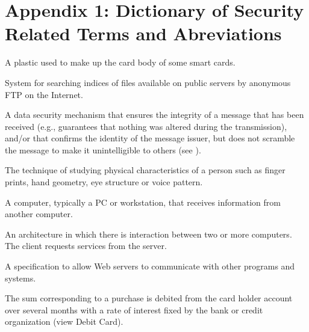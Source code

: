 \chapter{Appendix 1: Dictionary of Security Related Terms and Abreviations}

\begin{htmllist}
\item[Acrylonitrile Butadiene Styrene (ABS)]

A plastic used to make up the card body of some smart cards.


\item[Archie]

System for searching indices of files available on public servers by
anonymous FTP on the Internet.


\item[Authentication]
\label{authen}

A data security mechanism that ensures the integrity of a message that
has been received (e.g., guarantees that nothing was altered during the
transmission), and/or that confirms the identity of the message issuer,
but does not scramble the message to make it unintelligible to others
(see ).


\item[Biometrics]

The technique of studying physical characteristics of a person such as
finger prints, hand geometry, eye structure or voice pattern.


\item[Client]

A computer, typically a PC or workstation, that receives information
from another computer.


\item[Client-server]

An architecture in which there is interaction between two or more
computers. The client requests services from the server.


\item[Common Gateway Interface (CGI)]

A specification to allow Web servers to communicate with other programs
and systems.


\item[Credit Card]

The sum corresponding to a purchase is debited from the card holder
account over several months with a rate of interest fixed by the bank
or credit organization (view Debit Card).



\end{htmllist}
